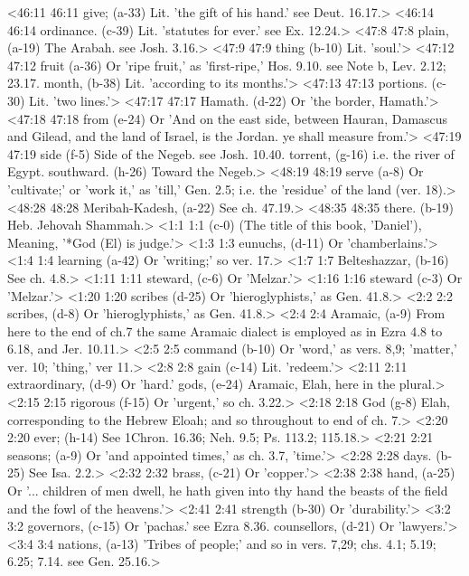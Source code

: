 <46:11 46:11  give; (a-33)  Lit. 'the gift of his hand.' see Deut. 16.17.>
<46:14 46:14  ordinance. (c-39)  Lit. 'statutes for ever.' see Ex. 12.24.>
<47:8 47:8  plain, (a-19)  The Arabah. see Josh. 3.16.>
<47:9 47:9  thing (b-10)  Lit. 'soul.'>
<47:12 47:12  fruit (a-36)  Or 'ripe fruit,' as 'first-ripe,' Hos. 9.10. see Note b, Lev.  2.12; 23.17.  month, (b-38)  Lit. 'according to its months.'>
<47:13 47:13  portions. (c-30)  Lit. 'two lines.'>
<47:17 47:17  Hamath. (d-22)  Or 'the border, Hamath.'>
<47:18 47:18  from (e-24)  Or 'And on the east side, between Hauran, Damascus and  Gilead, and the land of Israel, is the Jordan. ye shall measure  from.'>
<47:19 47:19  side (f-5)  Side of the Negeb. see Josh. 10.40.
  torrent, (g-16)  i.e. the river of Egypt.
  southward. (h-26)  Toward the Negeb.>
<48:19 48:19  serve (a-8)  Or 'cultivate;' or 'work it,' as 'till,' Gen. 2.5; i.e. the  'residue' of the land (ver. 18).>
<48:28 48:28  Meribah-Kadesh, (a-22)  See ch. 47.19.>
<48:35 48:35  there. (b-19)  Heb. Jehovah Shammah.>
<1:1 1:1   (c-0)  (The title of this book, 'Daniel'), Meaning, '*God (El) is  judge.'>
<1:3 1:3  eunuchs, (d-11)  Or 'chamberlains.'>
<1:4 1:4  learning (a-42)  Or 'writing;' so ver. 17.>
<1:7 1:7  Belteshazzar, (b-16)  See ch. 4.8.>
<1:11 1:11  steward, (c-6) Or 'Melzar.'>
<1:16 1:16  steward (c-3)  Or 'Melzar.'>
<1:20 1:20  scribes (d-25) Or 'hieroglyphists,' as Gen. 41.8.>
<2:2 2:2  scribes, (d-8)  Or 'hieroglyphists,' as Gen. 41.8.>
<2:4 2:4  Aramaic, (a-9)  From here to the end of ch.7 the same Aramaic dialect is  employed as in Ezra 4.8 to 6.18, and Jer. 10.11.>
<2:5 2:5  command (b-10)  Or 'word,' as vers. 8,9; 'matter,' ver. 10; 'thing,' ver 11.>
<2:8 2:8  gain (c-14)  Lit. 'redeem.'>
<2:11 2:11  extraordinary, (d-9)  Or 'hard.'
  gods, (e-24)  Aramaic, Elah, here in the plural.>
<2:15 2:15  rigorous (f-15)  Or 'urgent,' so ch. 3.22.>
<2:18 2:18  God (g-8)  Elah, corresponding to the Hebrew Eloah; and so  throughout to end of ch. 7.>
<2:20 2:20  ever; (h-14)  See 1Chron. 16.36; Neh. 9.5; Ps. 113.2; 115.18.>
<2:21 2:21  seasons; (a-9)  Or 'and appointed times,' as ch. 3.7, 'time.'>
<2:28 2:28  days. (b-25)  See Isa. 2.2.>
<2:32 2:32  brass, (c-21)  Or 'copper.'>
<2:38 2:38  hand, (a-25)  Or '... children of men dwell, he hath given into thy hand  the beasts of the field and the fowl of the heavens.'>
<2:41 2:41  strength (b-30)  Or 'durability.'>
<3:2 3:2  governors, (c-15)  Or 'pachas.' see Ezra 8.36.
  counsellors, (d-21)  Or 'lawyers.'>
<3:4 3:4  nations, (a-13)  'Tribes of people;' and so in vers. 7,29; chs. 4.1; 5.19;  6.25; 7.14. see Gen. 25.16.>

